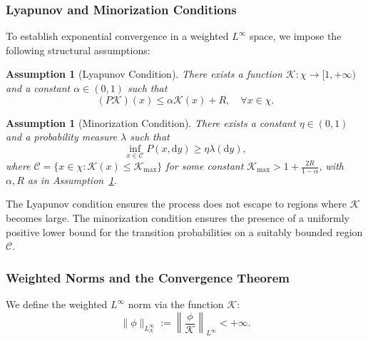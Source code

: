 \documentclass[11pt, twoside]{report}
\newtheorem{assumption}[theorem]{Assumption}
\begin{document}
\subsubsection{Lyapunov and Minorization Conditions}

To establish exponential convergence in a weighted $L^\infty$ space, we impose the following structural assumptions:

\begin{assumption}[Lyapunov Condition] \label{ass:lyapunov}
There exists a function $\mathcal{K} : \chi \to [1, +\infty)$ and a constant $\alpha \in (0,1)$ such that
\[
(P\mathcal{K})(x) \leq \alpha \mathcal{K}(x) + R, \quad \forall x \in \chi.
\]
\end{assumption}

\begin{assumption}[Minorization Condition] \label{ass:minorization}
There exists a constant $\eta \in (0,1)$ and a probability measure $\lambda$ such that
\[
\inf_{x \in \mathcal{C}} P(x, \mathrm{d}y) \geq \eta \lambda(\mathrm{d}y),
\]
where $\mathcal{C} = \{x \in \chi : \mathcal{K}(x) \leq \mathcal{K}_{\max}\}$ for some constant $\mathcal{K}_{\max} > 1 + \frac{2R}{1 - \alpha}$, with $\alpha, R$ as in Assumption~\ref{ass:lyapunov}.
\end{assumption}

The Lyapunov condition ensures the process does not escape to regions where $\mathcal{K}$ becomes large. The minorization condition ensures the presence of a uniformly positive lower bound for the transition probabilities on a suitably bounded region $\mathcal{C}$.

\subsubsection{Weighted Norms and the Convergence Theorem}

We define the weighted $L^\infty$ norm via the function $\mathcal{K}$:
\[
\|\phi\|_{L^\infty_\mathcal{K}} := \left\| \frac{\phi}{\mathcal{K}} \right\|_{L^\infty} < +\infty.
\]
\end{document}

